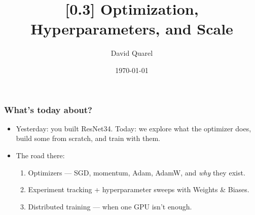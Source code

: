 \providecommand{\HANDOUT}{1}


\newcommand{\R}{\mathbb{R}}



\title[{[0.3] Optimization, Hyperparameters, and Scale}]
{{[0.3] Optimization, Hyperparameters, and Scale}}

\author[David Quarel]
{David Quarel}


\date[\today]
{\today}

\frame{\titlepage}

\begin{frame}
\frametitle{What's today about?}
\begin{itemize}
    \item Yesterday: you built ResNet34. Today: we explore what the optimizer does,
    build some from scratch, and train with them.
    \pause
    \item The road there:
    \begin{enumerate}
        \item Optimizers --- SGD, momentum, Adam, AdamW, and \emph{why}
        they exist.
        \pause
        \item Experiment tracking + hyperparameter sweeps with Weights \&
        Biases.
        \pause
        \item Distributed training --- when one GPU isn't enough.
    \end{enumerate}
\end{itemize}
\end{frame}

